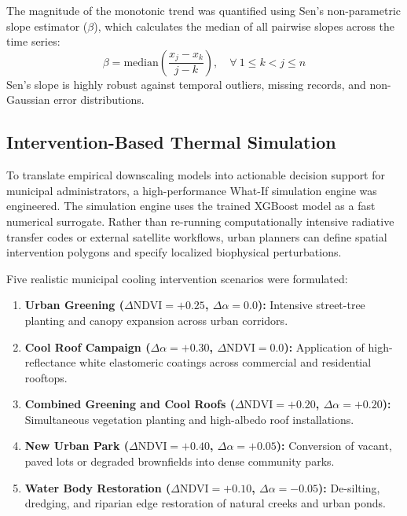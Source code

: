 \documentclass[a4paper,fleqn]{cas-sc}
\begin{document}
The magnitude of the monotonic trend was quantified using Sen's non-parametric slope estimator ($\beta$), which calculates the median of all pairwise slopes across the time series:
\begin{equation}
    \beta = \text{median}\left( \frac{x_j - x_k}{j - k} \right), \quad \forall \ 1 \le k < j \le n
    \label{eq:sens_slope}
\end{equation}
Sen's slope is highly robust against temporal outliers, missing records, and non-Gaussian error distributions.

\subsection{Intervention-Based Thermal Simulation}
\label{subsec:simulation_methods}

To translate empirical downscaling models into actionable decision support for municipal administrators, a high-performance What-If simulation engine was engineered. The simulation engine uses the trained XGBoost model as a fast numerical surrogate. Rather than re-running computationally intensive radiative transfer codes or external satellite workflows, urban planners can define spatial intervention polygons and specify localized biophysical perturbations.

Five realistic municipal cooling intervention scenarios were formulated:
\begin{enumerate}[1.]
    \item \textbf{Urban Greening ($\Delta\text{NDVI} = +0.25$, $\Delta\alpha = 0.0$):} Intensive street-tree planting and canopy expansion across urban corridors.
    \item \textbf{Cool Roof Campaign ($\Delta\alpha = +0.30$, $\Delta\text{NDVI} = 0.0$):} Application of high-reflectance white elastomeric coatings across commercial and residential rooftops.
    \item \textbf{Combined Greening and Cool Roofs ($\Delta\text{NDVI} = +0.20$, $\Delta\alpha = +0.20$):} Simultaneous vegetation planting and high-albedo roof installations.
    \item \textbf{New Urban Park ($\Delta\text{NDVI} = +0.40$, $\Delta\alpha = +0.05$):} Conversion of vacant, paved lots or degraded brownfields into dense community parks.
    \item \textbf{Water Body Restoration ($\Delta\text{NDVI} = +0.10$, $\Delta\alpha = -0.05$):} De-silting, dredging, and riparian edge restoration of natural creeks and urban ponds.
\end{enumerate}
\end{document}

